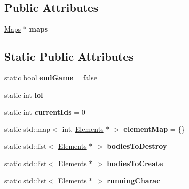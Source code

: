 \subsection*{Public Attributes}
\begin{DoxyCompactItemize}
\item 
\hypertarget{class_game_adef62d41374c1440a78855c7f9994697}{\hyperlink{class_maps}{Maps} $\ast$ {\bfseries maps}}\label{class_game_adef62d41374c1440a78855c7f9994697}

\end{DoxyCompactItemize}
\subsection*{Static Public Attributes}
\begin{DoxyCompactItemize}
\item 
\hypertarget{class_game_a6f05b1c88b1086147854b72defced72a}{static bool {\bfseries end\-Game} = false}\label{class_game_a6f05b1c88b1086147854b72defced72a}

\item 
\hypertarget{class_game_ac52883575849c7580b0b9dba48aef174}{static int {\bfseries lol}}\label{class_game_ac52883575849c7580b0b9dba48aef174}

\item 
\hypertarget{class_game_ae5bfa29230411c2605787261070909e6}{static int {\bfseries current\-Ids} = 0}\label{class_game_ae5bfa29230411c2605787261070909e6}

\item 
\hypertarget{class_game_a88aa459a01bbc438e665a19c53732c0e}{static std\-::map$<$ int, \hyperlink{class_elements}{Elements} $\ast$ $>$ {\bfseries element\-Map} = \{\}}\label{class_game_a88aa459a01bbc438e665a19c53732c0e}

\item 
\hypertarget{class_game_a078c48086258daf73a89bf4bde485969}{static std\-::list$<$ \hyperlink{class_elements}{Elements} $\ast$ $>$ {\bfseries bodies\-To\-Destroy}}\label{class_game_a078c48086258daf73a89bf4bde485969}

\item 
\hypertarget{class_game_a04166a78d83b34000f7ab31d867fef27}{static std\-::list$<$ \hyperlink{class_elements}{Elements} $\ast$ $>$ {\bfseries bodies\-To\-Create}}\label{class_game_a04166a78d83b34000f7ab31d867fef27}

\item 
\hypertarget{class_game_a80912de3bec452b5a8df21650422d20a}{static std\-::list$<$ \hyperlink{class_elements}{Elements} $\ast$ $>$ {\bfseries running\-Charac}}\label{class_game_a80912de3bec452b5a8df21650422d20a}


\end{DoxyCompactItemize}
